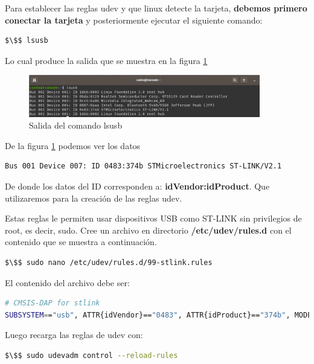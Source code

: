 Para establecer las reglas udev y que linux detecte la tarjeta, \textbf{debemos primero conectar la tarjeta} y posteriormente ejecutar el siguiente comando:

 \begin{lstlisting}[language=bash]
 	$\$$ lsusb
 \end{lstlisting} 

Lo cual produce la salida que se muestra en la figura \ref{cap1:005}

\begin{figure}[htb]
	\centering
	\includegraphics[width=0.9\textwidth]{capitulo1/lsusb.png}
	\caption{Salida del comando lsusb }
	\label{cap1:005}
\end{figure} 

De la figura \ref{cap1:005} podemos ver los datos

\begin{lstlisting}[language=bash]
Bus 001 Device 007: ID 0483:374b STMicroelectronics ST-LINK/V2.1
\end{lstlisting} 

De donde los datos del ID corresponden a: \textbf{idVendor:idProduct}. Que utilizaremos para la creación de las reglas udev.

Estas reglas le permiten usar dispositivos USB como ST-LINK sin privilegios de root, es decir, sudo. Cree un archivo en directorio \textbf{/etc/udev/rules.d} con el contenido que se muestra a continuación.

\begin{lstlisting}[language=bash]
$\$$ sudo nano /etc/udev/rules.d/99-stlink.rules
\end{lstlisting} 

El contenido del archivo debe ser:

\begin{lstlisting}[language=bash]
# CMSIS-DAP for stlink
SUBSYSTEM=="usb", ATTR{idVendor}=="0483", ATTR{idProduct}=="374b", MODE:="666"
\end{lstlisting} 

Luego recarga las reglas de udev con:

\begin{lstlisting}[language=bash]
$\$$ sudo udevadm control --reload-rules
\end{lstlisting} 

